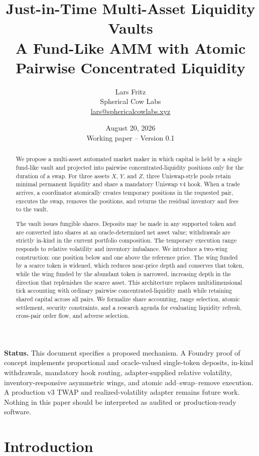 \documentclass[11pt]{article}
\title{\vspace{-1.5em}\textbf{Just-in-Time Multi-Asset Liquidity Vaults}\\
\large A Fund-Like AMM with Atomic Pairwise Concentrated Liquidity}
\author{Lars Fritz\\\small Spherical Cow Labs\\\small \href{mailto:lars@sphericalcowlabs.xyz}{lars@sphericalcowlabs.xyz}}
\date{August 20, 2026\\\small Working paper -- Version 0.1}
\begin{document}
\maketitle

\begin{abstract}
We propose a multi-asset automated market maker in which capital is held by a
single fund-like vault and projected into pairwise concentrated-liquidity
positions only for the duration of a swap. For three assets $X$, $Y$, and $Z$,
three Uniswap-style pools retain minimal permanent liquidity and share a
mandatory Uniswap v4 hook. When a trade arrives, a coordinator atomically
creates temporary positions in the requested pair, executes the swap, removes
the positions, and returns the residual inventory and fees to the vault.

The vault issues fungible shares. Deposits may be made in any supported token
and are converted into shares at an oracle-determined net asset value;
withdrawals are strictly in-kind in the current portfolio composition. The
temporary execution range responds to relative volatility and inventory
imbalance. We introduce a two-wing construction: one position below and one
above the reference price. The wing funded by a scarce token is widened, which
reduces near-price depth and conserves that token, while the wing funded by the
abundant token is narrowed, increasing depth in the direction that replenishes
the scarce asset. This architecture replaces multidimensional tick accounting
with ordinary pairwise concentrated-liquidity math while retaining shared
capital across all pairs. We formalize share accounting, range selection,
atomic settlement, security constraints, and a research agenda for evaluating
liquidity refresh, cross-pair order flow, and adverse selection.
\end{abstract}

\vspace{0.5em}
\noindent\textbf{Status.} This document specifies a proposed mechanism. A
Foundry proof of concept implements proportional and oracle-valued single-token
deposits, in-kind withdrawals, mandatory hook routing, adapter-supplied relative
volatility, inventory-responsive asymmetric wings, and atomic
add--swap--remove execution. A production v3 TWAP and realized-volatility
adapter remains future work. Nothing in this paper should be interpreted as
audited or production-ready software.

\tableofcontents
\newpage

\section{Introduction}
\end{document}

